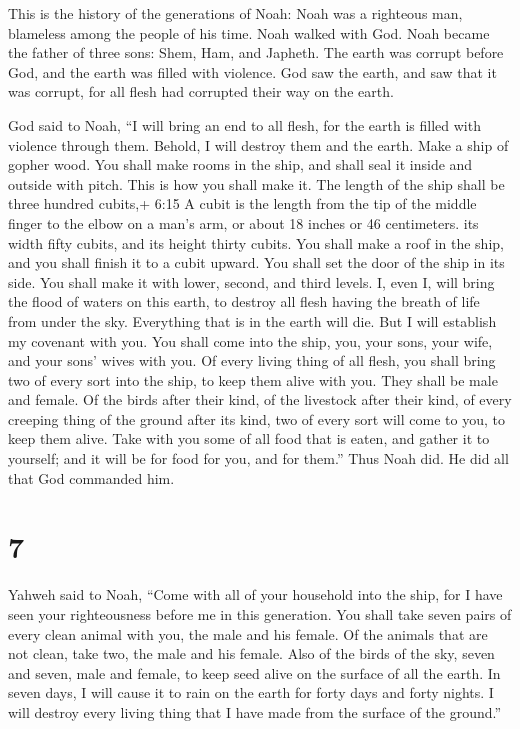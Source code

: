  This is the history of the generations of Noah: Noah was a
righteous man, blameless among the people of his time. Noah walked with
God.  Noah became the father of three sons: Shem, Ham, and
Japheth.  The earth was corrupt before God, and the earth
was filled with violence.  God saw the earth, and saw that
it was corrupt, for all flesh had corrupted their way on the earth.

 God said to Noah, ``I will bring an end to all flesh, for
the earth is filled with violence through them. Behold, I will destroy
them and the earth.  Make a ship of gopher wood. You shall
make rooms in the ship, and shall seal it inside and outside with pitch.
 This is how you shall make it. The length of the ship
shall be three hundred cubits,+ 6:15 A cubit is the length from the tip
of the middle finger to the elbow on a man's arm, or about 18 inches or
46 centimeters. its width fifty cubits, and its height thirty cubits.
 You shall make a roof in the ship, and you shall finish it
to a cubit upward. You shall set the door of the ship in its side. You
shall make it with lower, second, and third levels.  I,
even I, will bring the flood of waters on this earth, to destroy all
flesh having the breath of life from under the sky. Everything that is
in the earth will die.  But I will establish my covenant
with you. You shall come into the ship, you, your sons, your wife, and
your sons' wives with you.  Of every living thing of all
flesh, you shall bring two of every sort into the ship, to keep them
alive with you. They shall be male and female.  Of the
birds after their kind, of the livestock after their kind, of every
creeping thing of the ground after its kind, two of every sort will come
to you, to keep them alive.  Take with you some of all food
that is eaten, and gather it to yourself; and it will be for food for
you, and for them.''  Thus Noah did. He did all that God
commanded him.

\hypertarget{section-6}{%
\section{7}\label{section-6}}

 Yahweh said to Noah, ``Come with all of your household into
the ship, for I have seen your righteousness before me in this
generation.  You shall take seven pairs of every clean
animal with you, the male and his female. Of the animals that are not
clean, take two, the male and his female.  Also of the birds
of the sky, seven and seven, male and female, to keep seed alive on the
surface of all the earth.  In seven days, I will cause it to
rain on the earth for forty days and forty nights. I will destroy every
living thing that I have made from the surface of the ground.''

